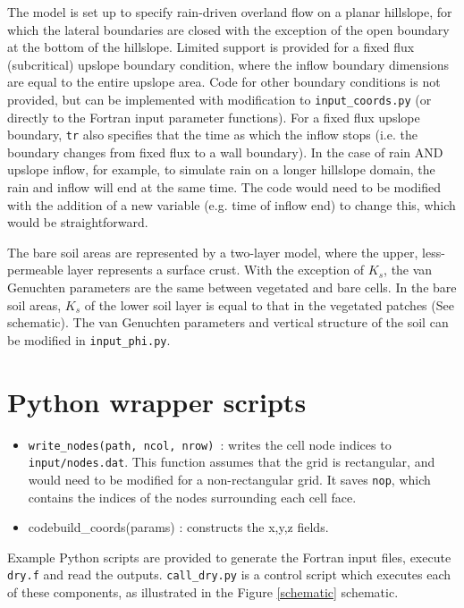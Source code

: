 \documentclass{article}
\newcommand{\code}[1]{\texttt{#1}}
\begin{document}
The model is set up to specify rain-driven overland flow on a planar hillslope, for which the lateral boundaries are closed with the exception of the open boundary at the bottom of the hillslope.  Limited support is provided for a fixed flux (subcritical) upslope boundary condition,  where the inflow boundary dimensions are equal to the entire upslope area.  Code for other boundary conditions is not provided, but can be implemented with modification to \code{input\_coords.py} (or directly to the Fortran input parameter functions).
For a fixed flux upslope boundary, \code{tr} also specifies that the time as which the inflow stops (i.e. the boundary changes from fixed flux to a wall boundary).  In the case of rain AND upslope inflow, for example, to simulate rain on a longer hillslope domain, the rain and inflow will end at the same time. The code would need to be modified with the addition of a new variable (e.g. time of inflow end) to change this, which would be straightforward. 

The bare soil areas are represented by a two-layer model, where the upper, less-permeable  layer represents a surface crust.  With the exception of $K_{s}$, the van Genuchten parameters are the same between vegetated and bare cells. In the bare soil areas, $K_{s}$ of the lower soil layer is  equal to that in the vegetated patches (See schematic).
The van Genuchten parameters and vertical structure of the soil can be modified in \code{input\_phi.py}.


\section{Python wrapper scripts}



\begin{itemize}
\item \code{write\_nodes(path, ncol, nrow)  }: writes the cell node indices to \code{input/nodes.dat}.  
    This function assumes that the grid is rectangular, and would need to be modified for a non-rectangular grid. 
       It saves \code{nop}, which contains the indices of the nodes surrounding each cell face.
\item code{build\_coords(params)} : constructs the x,y,z fields. 
\end{itemize}



Example Python scripts are provided to generate the Fortran input files, execute \code{dry.f} and read the outputs.   \code{call\_dry.py} is a control script which executes each of these components, as illustrated in the Figure \ref{schematic} schematic.
\end{document}
